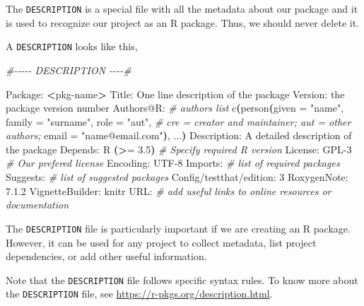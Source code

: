 \documentclass[
  11pt,
]{book}
\newenvironment{Shaded}{\begin{snugshade}}{\end{snugshade}}
\newcommand{\CommentTok}[1]{\textcolor[rgb]{0.56,0.35,0.01}{\textit{#1}}}
\newcommand{\ErrorTok}[1]{\textcolor[rgb]{0.64,0.00,0.00}{\textbf{#1}}}
\newcommand{\ExtensionTok}[1]{#1}
\newcommand{\KeywordTok}[1]{\textcolor[rgb]{0.13,0.29,0.53}{\textbf{#1}}}
\newcommand{\NormalTok}[1]{#1}
\newcommand{\OperatorTok}[1]{\textcolor[rgb]{0.81,0.36,0.00}{\textbf{#1}}}
\newcommand{\StringTok}[1]{\textcolor[rgb]{0.31,0.60,0.02}{#1}}
\begin{document}
The \texttt{DESCRIPTION} is a special file with all the metadata about our package and it is used to recognize our project as an R package. Thus, we should never delete it.

A \texttt{DESCRIPTION} looks like this,

\begin{Shaded}
\begin{Highlighting}[]
\CommentTok{\#{-}{-}{-}{-}{-}    DESCRIPTION    {-}{-}{-}{-}\#}

\ExtensionTok{Package:} \OperatorTok{\textless{}}\NormalTok{pkg{-}name}\OperatorTok{\textgreater{}}
\ExtensionTok{Title:}\NormalTok{ One line description of the package}
\ExtensionTok{Version:}\NormalTok{ the package version number}
\ExtensionTok{Authors@R:}  \CommentTok{\# authors list}
    \ExtensionTok{c}\ErrorTok{(}\ExtensionTok{person}\ErrorTok{(}\ExtensionTok{given}\NormalTok{ = }\StringTok{"name"}\NormalTok{,}
             \ExtensionTok{family}\NormalTok{ = }\StringTok{"surname"}\NormalTok{,}
             \ExtensionTok{role}\NormalTok{ = }\StringTok{"aut"}\NormalTok{,  }\CommentTok{\# cre = creator and maintainer; aut = other authors;}
             \ExtensionTok{email}\NormalTok{ = }\StringTok{"name@email.com"}\KeywordTok{)}\ExtensionTok{,}
      \ExtensionTok{...}\KeywordTok{)}
\ExtensionTok{Description:}\NormalTok{ A detailed description of the package}
\ExtensionTok{Depends:}\NormalTok{ R }\ErrorTok{(}\OperatorTok{\textgreater{}}\NormalTok{= }\ExtensionTok{3.5}\KeywordTok{)} \CommentTok{\# Specify required R version}
\ExtensionTok{License:}\NormalTok{ GPL{-}3      }\CommentTok{\# Our  prefered license}
\ExtensionTok{Encoding:}\NormalTok{ UTF{-}8}
\ExtensionTok{Imports:} \CommentTok{\# list of required packages}
\ExtensionTok{Suggests:} \CommentTok{\# list of suggested packages}
\ExtensionTok{Config/testthat/edition:}\NormalTok{ 3}
\ExtensionTok{RoxygenNote:}\NormalTok{ 7.1.2}
\ExtensionTok{VignetteBuilder:}\NormalTok{ knitr}
\ExtensionTok{URL:}     \CommentTok{\# add useful links to online resources or documentation }
\end{Highlighting}
\end{Shaded}

The \texttt{DESCRIPTION} file is particularly important if we are creating an R package. However, it can be used for any project to collect metadata, list project dependencies, or add other useful information.

Note that the \texttt{DESCRIPTION} file follows specific syntax rules. To know more about the \texttt{DESCRIPTION} file, see \url{https://r-pkgs.org/description.html}.
\end{document}
